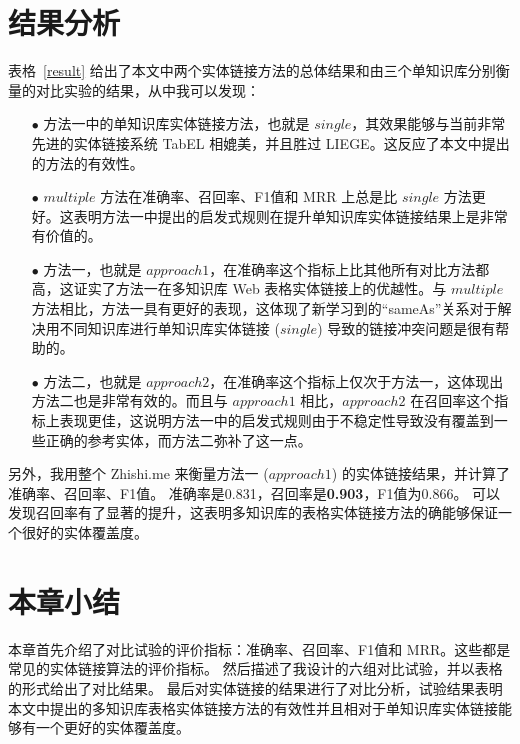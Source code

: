 \section{结果分析}
表格~\ref{result} 给出了本文中两个实体链接方法的总体结果和由三个单知识库分别衡量的对比实验的结果，从中我可以发现：
\begin{itemize}
  \item[$\bullet$] 方法一中的单知识库实体链接方法，也就是 $single$，其效果能够与当前非常先进的实体链接系统 TabEL 相媲美，并且胜过 LIEGE。这反应了本文中提出的方法的有效性。
  \item[$\bullet$] $multiple$ 方法在准确率、召回率、F1值和 MRR 上总是比 $single$ 方法更好。这表明方法一中提出的启发式规则在提升单知识库实体链接结果上是非常有价值的。
  \item[$\bullet$] 方法一，也就是 $approach1$，在准确率这个指标上比其他所有对比方法都高，这证实了方法一在多知识库 Web 表格实体链接上的优越性。与 $multiple$ 方法相比，方法一具有更好的表现，这体现了新学习到的``sameAs''关系对于解决用不同知识库进行单知识库实体链接 ($single$) 导致的链接冲突问题是很有帮助的。
  \item[$\bullet$] 方法二，也就是 $approach2$，在准确率这个指标上仅次于方法一，这体现出方法二也是非常有效的。而且与 $approach1$ 相比，$approach2$ 在召回率这个指标上表现更佳，这说明方法一中的启发式规则由于不稳定性导致没有覆盖到一些正确的参考实体，而方法二弥补了这一点。
\end{itemize}
另外，我用整个 Zhishi.me 来衡量方法一 ($approach1$) 的实体链接结果，并计算了准确率、召回率、F1值。
准确率是0.831，召回率是\textbf{0.903}，F1值为0.866。
可以发现召回率有了显著的提升，这表明多知识库的表格实体链接方法的确能够保证一个很好的实体覆盖度。


\section{本章小结}
本章首先介绍了对比试验的评价指标：准确率、召回率、F1值和 MRR。这些都是常见的实体链接算法的评价指标。
然后描述了我设计的六组对比试验，并以表格的形式给出了对比结果。
最后对实体链接的结果进行了对比分析，试验结果表明本文中提出的多知识库表格实体链接方法的有效性并且相对于单知识库实体链接能够有一个更好的实体覆盖度。